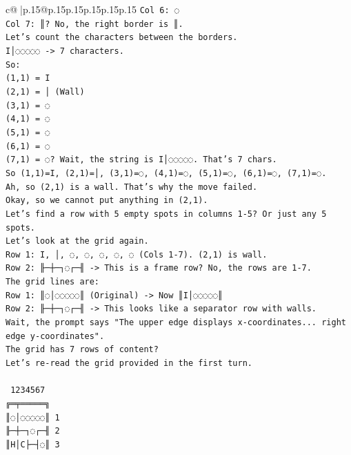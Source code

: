 \documentclass{article}
\begin{document}
{\begin{supertabular}{c@{$\;$}|p{.15\linewidth}@{}p{.15\linewidth}p{.15\linewidth}p{.15\linewidth}p{.15\linewidth}p{.15\linewidth}}
{{{\texttt{Col 6: ◌} \\
\texttt{Col 7: ║? No, the right border is ║.} \\
\texttt{Let's count the characters between the borders.} \\
\texttt{I│◌◌◌◌◌ {-}> 7 characters.} \\
\texttt{So:} \\
\texttt{(1,1) = I} \\
\texttt{(2,1) = │ (Wall)} \\
\texttt{(3,1) = ◌} \\
\texttt{(4,1) = ◌} \\
\texttt{(5,1) = ◌} \\
\texttt{(6,1) = ◌} \\
\texttt{(7,1) = ◌? Wait, the string is I│◌◌◌◌◌. That's 7 chars.} \\
\texttt{So (1,1)=I, (2,1)=│, (3,1)=◌, (4,1)=◌, (5,1)=◌, (6,1)=◌, (7,1)=◌.} \\
\texttt{Ah, so (2,1) is a wall. That's why the move failed.} \\
\texttt{Okay, so we cannot put anything in (2,1).} \\
\texttt{Let's find a row with 5 empty spots in columns 1{-}5? Or just any 5 spots.} \\
\texttt{Let's look at the grid again.} \\
\texttt{Row 1: I, │, ◌, ◌, ◌, ◌, ◌ (Cols 1{-}7). (2,1) is wall.} \\
\texttt{Row 2: ╟─┼─┐◌┌─╢ {-}> This is a frame row? No, the rows are 1{-}7.} \\
\texttt{The grid lines are:} \\
\texttt{Row 1: ║◌│◌◌◌◌◌║ (Original) {-}> Now ║I│◌◌◌◌◌║} \\
\texttt{Row 2: ╟─┼─┐◌┌─╢ {-}> This looks like a separator row with walls.} \\
\texttt{Wait, the prompt says "The upper edge displays x{-}coordinates... right edge y{-}coordinates".} \\
\texttt{The grid has 7 rows of content?} \\
\texttt{Let's re{-}read the grid provided in the first turn.} \\
\\ 
\texttt{ 1234567} \\
\texttt{╔═╤═════╗} \\
\texttt{║◌│◌◌◌◌◌║ 1} \\
\texttt{╟─┼─┐◌┌─╢ 2} \\
\texttt{║H│C├─┤◌║ 3} \\
}}}
\end{supertabular}}
\end{document}
